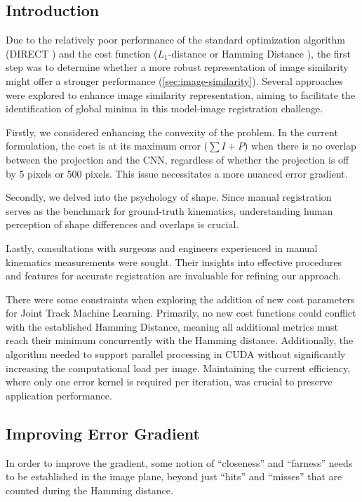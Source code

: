 \subsection{Introduction}
Due to the relatively poor performance of the standard optimization algorithm (DIRECT \cite{jonesLipschitzianOptimizationLipschitz1993,floodAutomatedRegistration3D2018}) and the cost function ($L_{1}$-distance or Hamming Distance \cite{floodAutomatedRegistration3D2018}), the first step was to determine whether a more robust representation of image similarity might offer a stronger performance (\cref{sec:image-similarity}).
Several approaches were explored to enhance image similarity representation, aiming to facilitate the identification of global minima in this model-image registration challenge.

Firstly, we considered enhancing the convexity of the problem.
In the current formulation, the cost is at its maximum error ($\sum I + P$) when there is no overlap between the projection and the CNN, regardless of whether the projection is off by 5 pixels or 500 pixels.
This issue necessitates a more nuanced error gradient.

Secondly, we delved into the psychology of shape.
Since manual registration serves as the benchmark for ground-truth kinematics, understanding human perception of shape differences and overlaps is crucial.

Lastly, consultations with surgeons and engineers experienced in manual kinematics measurements were sought. Their insights into effective procedures and features for accurate registration are invaluable for refining our approach.

There were some constraints when exploring the addition of new cost parameters for Joint Track Machine Learning.
Primarily, no new cost functions could conflict with the established Hamming Distance, meaning all additional metrics must reach their minimum concurrently with the Hamming distance.
Additionally, the algorithm needed to support parallel processing in CUDA without significantly increasing the computational load per image.
Maintaining the current efficiency, where only one error kernel is required per iteration, was crucial to preserve application performance.

\subsection{Improving Error Gradient}
In order to improve the gradient, some notion of ``closeness'' and ``farness'' needs to be established in the image plane, beyond just ``hits'' and ``misses'' that are counted during the Hamming distance.

